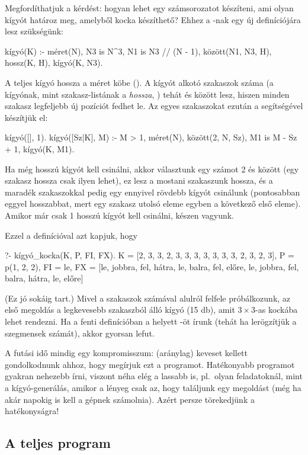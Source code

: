 Megfordíthatjuk a kérdést: hogyan lehet egy
számsorozatot készíteni, ami olyan kígyót határoz
meg, amelyből kocka készíthető? Ehhez a -nak
egy új definíciójára lesz szükségünk:
\begin{program}
kígyó(K) :-
    méret(N), N3 is N^3, N1 is N3 // (N - 1),
    között(N1, N3, H), hossz(K, H),
    kígyó(K, N3).
\end{program}
A teljes kígyó hossza a méret köbe (). A
kígyót alkotó szakaszok száma (a kígyónak, mint
szakasz-listának a \emph{hossza}, ) tehát
 és  között lesz, hiszen minden
szakasz legfeljebb  új pozíciót fedhet
le. Az egyes szakaszokat ezután a 
segítségével készítjük el:
\begin{program}
kígyó([], 1).
kígyó([Sz|K], M) :-
    M > 1, méret(N), között(2, N, Sz),
    M1 is M - Sz + 1, kígyó(K, M1).
\end{program}
Ha még  hosszú kígyót kell csinálni, akkor
választunk egy számot 2 és  között (egy
szakasz hossza csak ilyen lehet), ez lesz a mostani
szakaszunk hossza, és a maradék szakaszokkal pedig
egy ennyivel rövdebb kígyót csinálunk (pontosabban
eggyel hosszabbat, mert egy szakasz utolsó eleme
egyben a következő első eleme). Amikor már csak 1
hosszú kígyót kell csinálni, készen vagyunk.

Ezzel a definícióval azt kapjuk, hogy
\begin{query}
?- kígyó_kocka(K, P, FI, FX).
K = [2, 3, 3, 2, 3, 3, 3, 3, 3, 3, 3, 2, 3, 2, 3],
P = p(1, 2, 2),
FI = le,
FX = [le, jobbra, fel, hátra, le, balra, fel, előre,
      le, jobbra, fel, balra, hátra, le, előre] 
\end{query}
(Ez jó sokáig tart.) Mivel a szakaszok számával
alulról felfele próbálkozunk, az első megoldás a
legkevesebb szakaszból álló kígyó (15 db), amit
$3\times3$-as kockába lehet rendezni. Ha a fenti
definícióban a  helyett -öt írunk (tehát ha lerögzítjük a szegmensek
számát), akkor gyorsan lefut.

A futási idő mindig egy kompromisszum: (aránylag)
keveset kellett gondolkodnunk ahhoz, hogy megírjuk
ezt a programot. Hatékonyabb programot gyakran
nehezebb írni, viszont néha elég a lassabb is,
pl.~olyan feladatoknál, mint a kígyó-generálás,
amikor a lényeg csak az, hogy találjunk egy
megoldást (még ha akár napokig is kell a gépnek
számolnia). Azért persze törekedjünk a
hatékonyságra!

\subsection*{A teljes program}

